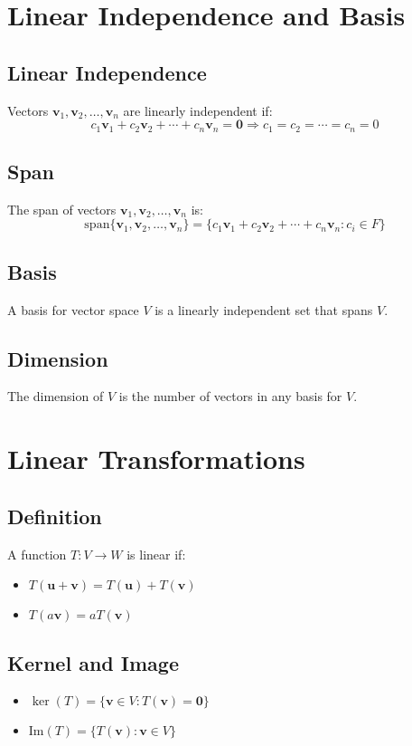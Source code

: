 \documentclass[11pt]{article}
\begin{document}
\section{Linear Independence and Basis}

\subsection{Linear Independence}
Vectors $\mathbf{v}_1, \mathbf{v}_2, \ldots, \mathbf{v}_n$ are linearly independent if:
$$c_1\mathbf{v}_1 + c_2\mathbf{v}_2 + \cdots + c_n\mathbf{v}_n = \mathbf{0} \Rightarrow c_1 = c_2 = \cdots = c_n = 0$$

\subsection{Span}
The span of vectors $\mathbf{v}_1, \mathbf{v}_2, \ldots, \mathbf{v}_n$ is:
$$\text{span}\{\mathbf{v}_1, \mathbf{v}_2, \ldots, \mathbf{v}_n\} = \{c_1\mathbf{v}_1 + c_2\mathbf{v}_2 + \cdots + c_n\mathbf{v}_n : c_i \in F\}$$

\subsection{Basis}
A basis for vector space $V$ is a linearly independent set that spans $V$.

\subsection{Dimension}
The dimension of $V$ is the number of vectors in any basis for $V$.

\section{Linear Transformations}

\subsection{Definition}
A function $T: V \to W$ is linear if:
\begin{itemize}
    \item $T(\mathbf{u} + \mathbf{v}) = T(\mathbf{u}) + T(\mathbf{v})$
    \item $T(a\mathbf{v}) = aT(\mathbf{v})$
\end{itemize}

\subsection{Kernel and Image}
\begin{itemize}
    \item $\ker(T) = \{\mathbf{v} \in V : T(\mathbf{v}) = \mathbf{0}\}$
    \item $\text{Im}(T) = \{T(\mathbf{v}) : \mathbf{v} \in V\}$
\end{itemize}
\end{document}
